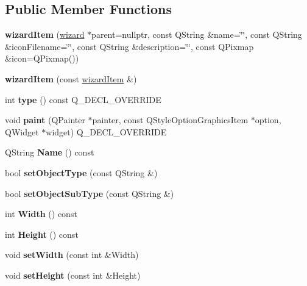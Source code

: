 \subsection*{Public Member Functions}
\begin{DoxyCompactItemize}
\item 
\mbox{\label{classwizard_item_a262749393a67d04180edbfcc22e07197}} 
{\bfseries wizard\+Item} (\hyperlink{classwizard}{wizard} $\ast$parent=nullptr, const Q\+String \&name=\char`\"{}\char`\"{}, const Q\+String \&icon\+Filename=\char`\"{}\char`\"{}, const Q\+String \&description=\char`\"{}\char`\"{}, const Q\+Pixmap \&icon=Q\+Pixmap())
\item 
\mbox{\label{classwizard_item_a233c83e6a34a4afe1e1ca15a7d5484f3}} 
{\bfseries wizard\+Item} (const \hyperlink{classwizard_item}{wizard\+Item} \&)
\item 
\mbox{\label{classwizard_item_a294787a715d07c05303bf0569d5a4ebf}} 
int {\bfseries type} () const Q\+\_\+\+D\+E\+C\+L\+\_\+\+O\+V\+E\+R\+R\+I\+DE
\item 
\mbox{\label{classwizard_item_acec52e563e9fe69cb583297304d3032b}} 
void {\bfseries paint} (Q\+Painter $\ast$painter, const Q\+Style\+Option\+Graphics\+Item $\ast$option, Q\+Widget $\ast$widget) Q\+\_\+\+D\+E\+C\+L\+\_\+\+O\+V\+E\+R\+R\+I\+DE
\item 
\mbox{\label{classwizard_item_ada4b0fd0fd35c2cc04e6eb86e9b0fcb5}} 
Q\+String {\bfseries Name} () const
\item 
\mbox{\label{classwizard_item_ac89329599a6a987e42b649e0e86023d4}} 
bool {\bfseries set\+Object\+Type} (const Q\+String \&)
\item 
\mbox{\label{classwizard_item_a60df2ef9cb516c943a9042a90251073d}} 
bool {\bfseries set\+Object\+Sub\+Type} (const Q\+String \&)
\item 
\mbox{\label{classwizard_item_aef52fc276573e48cd10c2b7757164df3}} 
int {\bfseries Width} () const
\item 
\mbox{\label{classwizard_item_a7957a5e9f10d9d928642076024c2cd01}} 
int {\bfseries Height} () const
\item 
\mbox{\label{classwizard_item_a9f01eae778fdbb447622ff754cfba917}} 
void {\bfseries set\+Width} (const int \&Width)
\item 
\mbox{\label{classwizard_item_aaebe637353bcf72e882c1f0bedc26912}} 
void {\bfseries set\+Height} (const int \&Height)
\end{DoxyCompactItemize}
